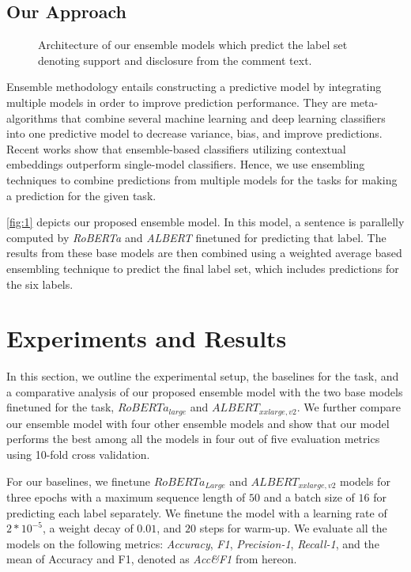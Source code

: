 \documentclass[runningheads]{llncs}
\begin{document}
\subsection{Our Approach}

\begin{figure}[!h]
        \caption{\label{fig:1} Architecture of our ensemble models which predict the label set denoting support and disclosure from the comment text.}
\end{figure}

Ensemble methodology entails constructing a predictive model by integrating multiple models in order to improve prediction performance. They are meta-algorithms that combine several machine learning and deep learning classifiers into one predictive model to decrease variance, bias, and improve predictions. Recent works show that ensemble-based classifiers utilizing contextual embeddings outperform single-model classifiers.\cite{2020roberta,2020albert} Hence, we use ensembling techniques to combine predictions from multiple models for the tasks for making a prediction for the given task.

 \autoref{fig:1} depicts our proposed ensemble model. In this model, a sentence is parallelly computed by \textit{RoBERTa} and \textit{ALBERT} finetuned for predicting that label. The results from these base models are then combined using a weighted average based ensembling technique to predict the final label set, which includes predictions for the six labels.

\section{Experiments and Results}

In this section, we outline the experimental setup, the baselines for the task, and a comparative analysis of our proposed ensemble model with the two base models finetuned for the task, $RoBERTa_{large}$ and $ALBERT_{xxlarge,v2}$. We further compare our ensemble model with four other ensemble models and show that our model performs the best among all the models in four out of five evaluation metrics using 10-fold cross validation. 

For our baselines, we finetune $RoBERTa_{Large}$ and $ALBERT_{xxlarge,v2}$ models for three epochs with a maximum sequence length of $50$ and a batch size of $16$ for predicting each label separately. We finetune the model with a learning rate of $2*10^{-5}$, a weight decay of $0.01$, and $20$ steps for warm-up. We evaluate all the models on the following metrics: \textit{Accuracy}, \textit{F1}, \textit{Precision-1}, \textit{Recall-1}, and the mean of Accuracy and F1, denoted as \textit{Acc\&F1} from hereon.
\end{document}
